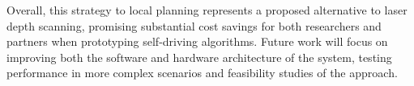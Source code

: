 \documentclass[conference]{IEEEtran}
\begin{document}
Overall, this strategy to local planning represents a proposed alternative to laser depth scanning, promising substantial cost savings for both researchers and partners when prototyping self-driving algorithms. Future work will focus on improving both the software and hardware architecture of the system, testing performance in more complex scenarios and feasibility studies of the approach.   


 





\end{document}
